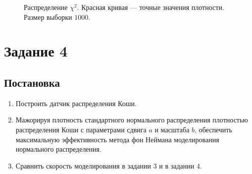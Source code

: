 \documentclass[12pt, a4paper]{article}
\begin{document}
\begin{figure}[H]
\caption{Распределение $\chi^2$. Красная кривая --- точные значения плотности. Размер выборки $1000$.}
\end{figure}

\newpage

\section{Задание 4}
\subsection{Постановка}
\begin{enumerate}
\item Построить датчик распределения Коши.
\item Мажорируя плотность стандартного нормального распределения плотностью распределения Коши с параметрами сдвига $a$ и масштаба $b$, обеспечить максимальную эффективность метода фон Неймана моделирования нормального распределения.
\item Сравнить скорость моделирования в задании 3 и в задании 4.
\end{enumerate}
\end{document}
